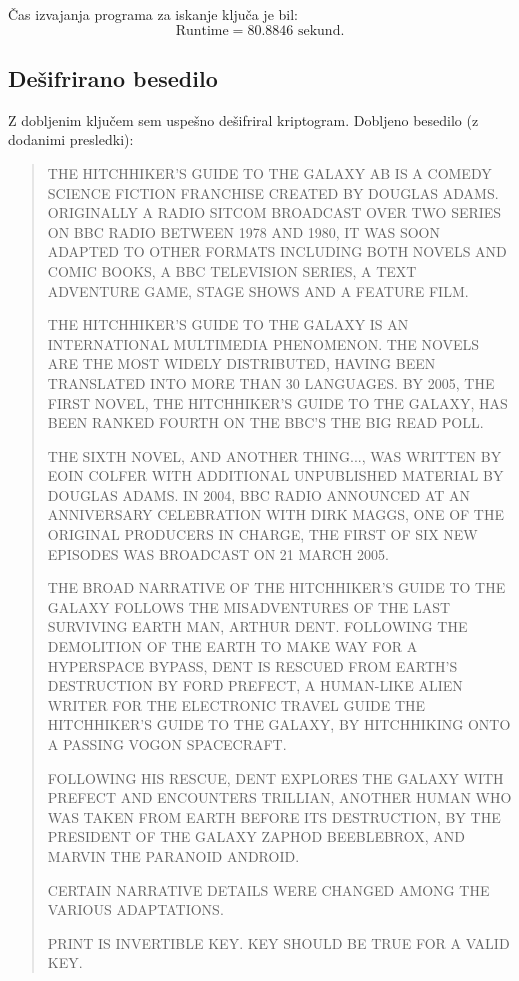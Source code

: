 \documentclass[12pt,a4paper]{article}
\begin{document}
Čas izvajanja programa za iskanje ključa je bil:
\[
\text{Runtime} = 80.8846 \text{ sekund}.
\]

\subsection{Dešifrirano besedilo}

Z dobljenim ključem sem uspešno dešifriral kriptogram. Dobljeno besedilo (z dodanimi presledki):

\begin{quote}
THE HITCHHIKER'S GUIDE TO THE GALAXY AB IS A COMEDY SCIENCE FICTION FRANCHISE CREATED BY DOUGLAS ADAMS. ORIGINALLY A RADIO SITCOM BROADCAST OVER TWO SERIES ON BBC RADIO BETWEEN 1978 AND 1980, IT WAS SOON ADAPTED TO OTHER FORMATS INCLUDING BOTH NOVELS AND COMIC BOOKS, A BBC TELEVISION SERIES, A TEXT ADVENTURE GAME, STAGE SHOWS AND A FEATURE FILM.

THE HITCHHIKER'S GUIDE TO THE GALAXY IS AN INTERNATIONAL MULTIMEDIA PHENOMENON. THE NOVELS ARE THE MOST WIDELY DISTRIBUTED, HAVING BEEN TRANSLATED INTO MORE THAN 30 LANGUAGES. BY 2005, THE FIRST NOVEL, THE HITCHHIKER'S GUIDE TO THE GALAXY, HAS BEEN RANKED FOURTH ON THE BBC'S THE BIG READ POLL.

THE SIXTH NOVEL, AND ANOTHER THING..., WAS WRITTEN BY EOIN COLFER WITH ADDITIONAL UNPUBLISHED MATERIAL BY DOUGLAS ADAMS. IN 2004, BBC RADIO ANNOUNCED AT AN ANNIVERSARY CELEBRATION WITH DIRK MAGGS, ONE OF THE ORIGINAL PRODUCERS IN CHARGE, THE FIRST OF SIX NEW EPISODES WAS BROADCAST ON 21 MARCH 2005.

THE BROAD NARRATIVE OF THE HITCHHIKER'S GUIDE TO THE GALAXY FOLLOWS THE MISADVENTURES OF THE LAST SURVIVING EARTH MAN, ARTHUR DENT. FOLLOWING THE DEMOLITION OF THE EARTH TO MAKE WAY FOR A HYPERSPACE BYPASS, DENT IS RESCUED FROM EARTH'S DESTRUCTION BY FORD PREFECT, A HUMAN-LIKE ALIEN WRITER FOR THE ELECTRONIC TRAVEL GUIDE THE HITCHHIKER'S GUIDE TO THE GALAXY, BY HITCHHIKING ONTO A PASSING VOGON SPACECRAFT.

FOLLOWING HIS RESCUE, DENT EXPLORES THE GALAXY WITH PREFECT AND ENCOUNTERS TRILLIAN, ANOTHER HUMAN WHO WAS TAKEN FROM EARTH BEFORE ITS DESTRUCTION, BY THE PRESIDENT OF THE GALAXY ZAPHOD BEEBLEBROX, AND MARVIN THE PARANOID ANDROID.

CERTAIN NARRATIVE DETAILS WERE CHANGED AMONG THE VARIOUS ADAPTATIONS.

PRINT IS INVERTIBLE KEY. KEY SHOULD BE TRUE FOR A VALID KEY.
\end{quote}
\end{document}
